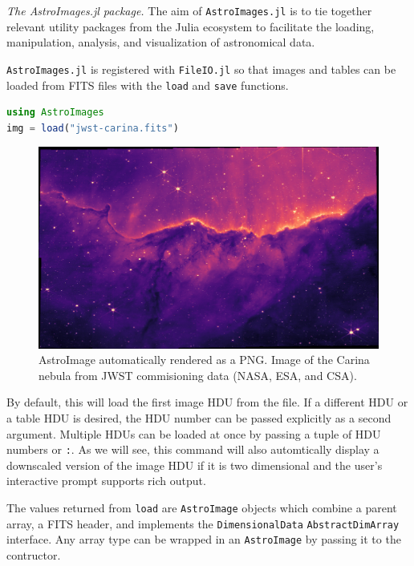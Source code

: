 \documentclass{juliacon}
\begin{document}
\clearpage
\emph{The AstroImages.jl package.}
The aim of \verb|AstroImages.jl| is to tie together relevant utility packages from the Julia ecosystem to facilitate the loading, manipulation, analysis, and visualization of astronomical data.

\verb|AstroImages.jl| is registered with \verb|FileIO.jl| so that images and tables can be loaded from FITS files with the \verb|load| and \verb|save| functions.
\begin{lstlisting}[language = Julia]
using AstroImages
img = load("jwst-carina.fits")
\end{lstlisting}

\vspace{-0.4cm}
\begin{figure}[hbt!]
\centerline{\includegraphics[width=\columnwidth]{carina.png}}
\caption{AstroImage automatically rendered as a PNG. Image of the Carina nebula from JWST commisioning data (NASA, ESA, and CSA).}
  \label{fig:jwst-carina}
\end{figure}
\FloatBarrier 

By default, this will load the first image HDU from the file. If a different HDU or a table HDU is desired, the HDU number can be passed explicitly as a second argument.
Multiple HDUs can be loaded at once by passing a tuple of HDU numbers or \verb|:|. As we will see, this command will also automtically display a downscaled version of the image HDU if it is two dimensional and the user's interactive prompt supports rich output.

The values returned from \verb|load| are \verb|AstroImage| objects which combine a parent array, a FITS header, and implements the \verb|DimensionalData| \verb|AbstractDimArray| interface.%
Any array type can be wrapped in an \verb|AstroImage| by passing it to the contructor.
\end{document}
